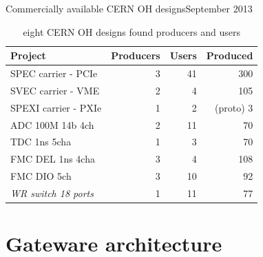 \documentclass[compress,red]{beamer}
\begin{document}
\begin{frame}{Commercially available CERN OH designs}{September 2013}

  \begin{table}
    \centering

    \begin{tabular}{|l||r|r|r|}
      \hline
      Project & Producers & Users & Produced\\
      \hline\hline
      SPEC carrier - PCIe & 3 & 41 & 300 \\
      \hline
      SVEC carrier - VME & 2 & 4 & 105 \\
      \hline
      SPEXI carrier - PXIe & 1 & 2 & (proto) 3 \\
      \hline
      \hline
      ADC 100M 14b 4ch & 2 & 11 & 70 \\
      \hline
      TDC 1ns 5cha & 1 & 3 & 70 \\
      \hline
      FMC DEL 1ns 4cha & 3 & 4 & 108 \\
      \hline
      FMC DIO 5ch & 3 & 10 & 92 \\
      \hline
      \hline
      \textit{WR switch 18 ports} & 1 & 11 & 77\\
      \hline
    \end{tabular}

    \caption{eight CERN OH designs found producers and users}
  \end{table}

  \note[item]{}

\end{frame}


\section{Gateware architecture}

\subsection*{} %
\end{document}
